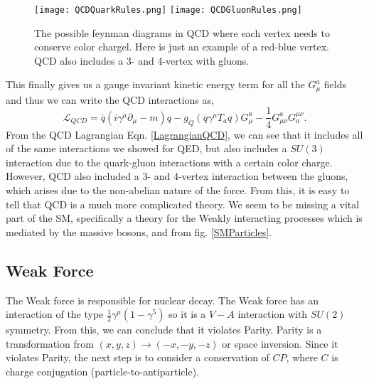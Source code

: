\begin{figure}[!htb]
	  \texttt{[image: QCDQuarkRules.png]}
	\endminipage\hfill
	  \texttt{[image: QCDGluonRules.png]}
	\endminipage\hfill
	\caption[QCD Feynman Diagrams]{The possible feynman diagrams in QCD where each vertex needs to conserve color chargel. Here is just an example of a red-blue vertex. QCD also includes a 3- and 4-vertex with gluons.}
 	\label{QCDRules} 
\end{figure}

This finally gives us a gauge invariant kinetic energy term for all the $G_\mu^a$ fields and thus we can write the QCD interactions as,
\begin{equation}\label{LagrangianQCD}
\mathcal{L}_{QCD}=\overline{q}(i\gamma^\mu\partial_\mu-m)q-g_Q(\overline{q}\gamma^\mu T_a q)G^a_\mu-\frac{1}{4}G^a_{\mu\nu}G_a^{\mu\nu}.
\end{equation}
From the QCD Lagrangian Eqn. \ref{LagrangianQCD}, we can see that it includes all of the same interactions we showed for QED, but also includes a $SU(3)$ interaction due to the quark-gluon interactions with a certain color charge. However, QCD also included a 3- and 4-vertex interaction between the gluons, which arises due to the non-abelian nature of the force. From this, it is easy to tell that QCD is a much more complicated theory. We seem to be missing a vital part of the SM, specifically a theory for the Weakly interacting processes which is mediated by the massive bosons, \W{} and \Z{} from fig. \ref{SMParticles}. 

\subsection{Weak Force}
\label{WeakForce}

The Weak force is responsible for nuclear decay. The Weak force has an interaction of the type $\frac{1}{2}\gamma^\mu(1-\gamma^5)$ so it is a $V-A$ interaction with $SU(2)$ symmetry. From this, we can conclude that it violates Parity. Parity is a transformation from $(x, y, z)\rightarrow(-x,-y,-z)$ or space inversion. Since it violates Parity, the next step is to consider a conservation of $CP$, where $C$ is charge conjugation (particle-to-antiparticle). 

